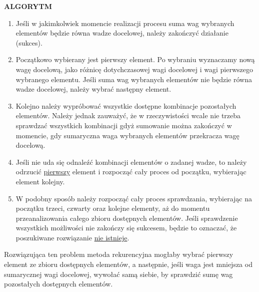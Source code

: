\documentclass[../algorytmy.tex]{subfiles}
\begin{document}
    \textbf{ALGORYTM}
    \begin{enumerate}
        \item Jeśli w jakimkolwiek momencie realizacji procesu suma wag
            wybranych elementów będzie równa  wadze docelowej, należy zakończyć
            działanie (sukces).
        \item Początkowo wybierany jest pierwszy element. Po wybraniu wyznaczamy
            nową wagę docelową, jako różnicę dotychczasowej wagi docelowej i
            wagi pierwszego wybranego elementu. Jeśli suma wag wybranych
            elementów nie będzie równa  wadze docelowej, należy wybrać następny
            element.
        \item Kolejno należy wypróbować wszystkie dostępne kombinacje
            pozostałych elementów. Należy jednak zauważyć, że w rzeczywistości
            wcale nie trzeba sprawdzać wszystkich kombinacji gdyż sumowanie
            można zakończyć w momencie, gdy sumaryczna waga wybranych elementów
            przekracza wagę docelową.
        \item Jeśli nie uda się odnaleźć kombinacji elementów o zadanej wadze,
            to należy odrzucić \underline{pierwszy} element i rozpocząć cały
            proces od początku, wybierając element kolejny.
        \item W podobny sposób należy rozpocząć cały proces sprawdzania,
            wybierając na początku trzeci, czwarty oraz kolejne elementy, aż do
            momentu przeanalizowania całego zbioru dostępnych elementów. Jeśli
            sprawdzenie wszystkich możliwości nie zakończy się sukcesem, będzie
            to oznaczać, że poszukiwane rozwiązanie \underline{nie istnieje}.
    \end{enumerate}

    Rozwiązująca ten problem metoda rekurencyjna mogłaby wybrać pierwszy element
    ze zbioru dostępnych elementów, a następnie, jeśli waga jest mniejsza od
    sumarycznej wagi docelowej, wywołać samą siebie, by sprawdzić sumę wag
    pozostałych dostępnych elementów.

    \pagebreak
\end{document}
